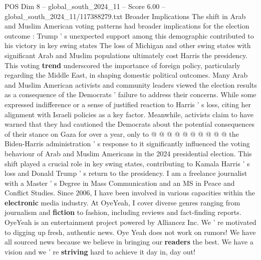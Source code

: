 \begin{textsample}{POS Dim 8 – global\_south\_2024\_11 – Score 6.00 – global\_south\_2024\_11/117388279.txt}
Broader Implications The shift in Arab and Muslim American voting patterns had broader implications for the election outcome : Trump ' s unexpected support among this demographic contributed to his victory in key swing states The loss of Michigan and other swing states with significant Arab and Muslim populations ultimately cost Harris the presidency.
This voting \textbf{trend} underscored the importance of foreign policy, particularly regarding the Middle East, in shaping domestic political outcomes.
Many Arab and Muslim American activists and community leaders viewed the election results as a consequence of the Democrats ' failure to address their concerns.
While some expressed indifference or a sense of justified reaction to Harris ' s loss, citing her alignment with Israeli policies as a key factor.
Meanwhile, activists claim to have warned that they had cautioned the Democrats about the potential consequences of their stance on Gaza for over a year, only to @ @ @ @ @ @ @ @ @ @ the Biden-Harris administration ' s response to it significantly influenced the voting behaviour of Arab and Muslim Americans in the 2024 presidential election.
This shift played a crucial role in key swing states, contributing to Kamala Harris ' s loss and Donald Trump ' s return to the presidency.
I am a freelance journalist with a Master ' s Degree in Mass Communication and an MS in Peace and Conflict Studies.
Since 2006, I have been involved in various capacities within the \textbf{electronic} media industry.
At OyeYeah, I cover diverse genres ranging from journalism and \textbf{fiction} to fashion, including reviews and fact-finding reports.
OyeYeah is an entertainment project powered by Alliancez Inc.
We ' re motivated to digging up fresh, authentic news.
Oye Yeah does not work on rumors!
We have all sourced news because we believe in bringing our \textbf{readers} the best.
We have a vision and we ' re \textbf{striving} hard to achieve it day in, day out!

\end{textsample}
